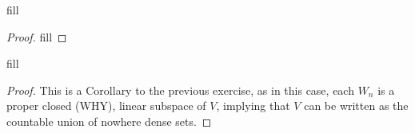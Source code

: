 \begin{exercise}{48}
fill
\end{exercise}
\begin{proof}
fill
\end{proof} 

\begin{exercise}{49}
fill
\end{exercise}
\begin{proof}
This is a Corollary to the previous exercise, as in this case, each $W_n$ is a proper closed (WHY), linear subspace of $V$, implying that $V$ can be written as the countable union of nowhere dense sets.
\end{proof} 